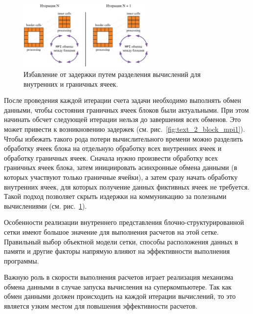 \begin{figure}[ht]
	\centering
	\includegraphics[width=0.6\textwidth]{./pics/text_2_block/12-mpi2.png}
	\caption{Избавление от задержки путем разделения вычислений для внутренних и граничных ячеек.}
	\label{fig:text_2_block_mpi2}
\end{figure}

После проведения каждой итерации счета задачи необходимо выполнять обмен данными, чтобы состояния граничных ячеек блоков были актуальными.
При этом начинать обсчет следующей итерации нельзя до завершения всех обменов.
Это может привести к возникновению задержек (см. рис.~\ref{fig:text_2_block_mpi1}).
Чтобы избежать такого рода потери вычислительного времени можно разделить обработку ячеек блока на отдельную обработку всех внутренних ячеек и обработку граничных ячеек.
Сначала нужно произвести обработку всех граничных ячеек блока, затем инициировать асинхронные обмена данными (в которых участвуют только граничные ячейки), а затем сразу начать обработку внутренних ячеек, для которых получение данных фиктивных ячеек не требуется.
Такой подход позволяет скрыть издержки на коммуникацию за полезными вычислениями (см. рис.~\ref{fig:text_2_block_mpi2}).

Особенности реализации внутреннего представления блочно-структурированной сетки имеют большое значение для выполнения расчетов на этой сетке.
Правильный выбор объектной модели сетки, способы расположения данных в памяти и другие факторы напрямую влияют на эффективности выполнения программы.

Важную роль в скорости выполнения расчетов играет реализация механизма обмена данными в случае запуска вычисления на суперкомпьютере.
Так как обмен данными должен происходить на каждой итерации вычислений, то это является узким местом для повышения эффективности расчетов.
